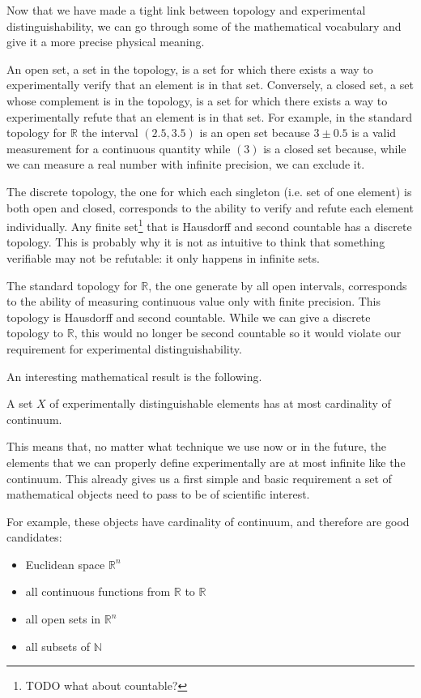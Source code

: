 \documentclass[11pt,letterpaper,fleqn]{memoir} %
\begin{document}
Now that we have made a tight link between topology and experimental distinguishability, we can go through some of the mathematical vocabulary and give it a more precise physical meaning.

An open set, a set in the topology, is a set for which there exists a way to  experimentally verify that an element is in that set. Conversely, a closed set, a set whose complement is in the topology, is a set for which there exists a way to experimentally refute that an element is in that set. For example, in the standard topology for $\mathbb{R}$ the interval $(2.5, 3.5)$ is an open set because $3 \pm 0.5$ is a valid measurement for a continuous quantity while $(3)$ is a closed set because, while we can measure a real number with infinite precision, we can exclude it.

The discrete topology, the one for which each singleton (i.e. set of one element) is both open and closed, corresponds to the ability to verify and refute each element individually. Any finite set\footnote{TODO what about countable?} that is Hausdorff and second countable has a discrete topology. This is probably why it is not as intuitive to think that something verifiable may not be refutable: it only happens in infinite sets.

The standard topology for $\mathbb{R}$, the one generate by all open intervals, corresponds to the ability of measuring continuous value only with finite precision. This topology is Hausdorff and second countable. While we can give a discrete topology to $\mathbb{R}$, this would no longer be second countable so it would violate our requirement for experimental distinguishability.

An interesting mathematical result is the following.

\begin{prop}
	A set $X$ of experimentally distinguishable elements has at most cardinality of continuum.
\end{prop}

This means that, no matter what technique we use now or in the future, the elements that we can properly define experimentally are at most infinite like the continuum. This already gives us a first simple and basic requirement a set of mathematical objects need to pass to be of scientific interest.

For example, these objects have cardinality of continuum, and therefore are good candidates:
\begin{itemize}
	\item Euclidean space $\mathbb{R}^n$
	\item all continuous functions from $\mathbb{R}$ to $\mathbb{R}$
	\item all open sets in $\mathbb{R}^n$
	\item all subsets of $\mathbb{N}$
\end{itemize}
\end{document}

